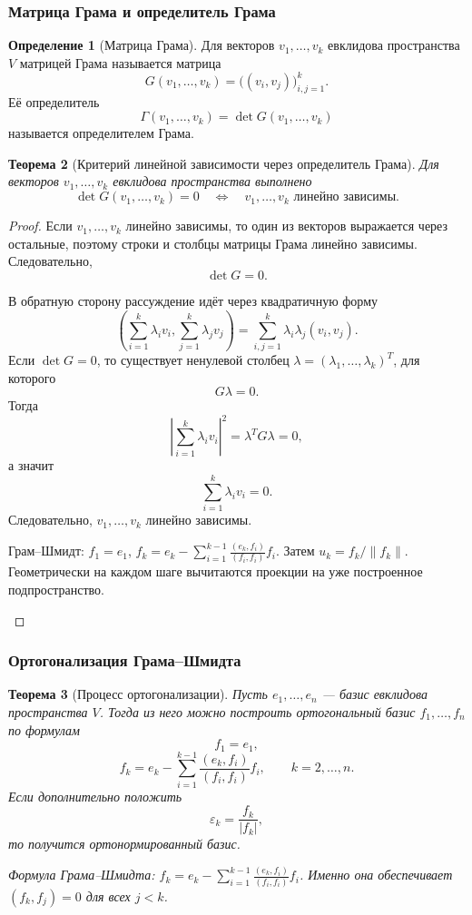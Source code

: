 \documentclass[12pt,a4paper]{article}
\theoremstyle{definition}
\newtheorem{definition}{Определение}[section]
\theoremstyle{plain}
\newtheorem{theorem}[definition]{Теорема}
\theoremstyle{remark}
\newenvironment{knowledgefix}{\begin{clarifybox}}{\end{clarifybox}}
\begin{document}
\subsubsection{Матрица Грама и определитель Грама}


\begin{definition}[Матрица Грама]
Для векторов $v_1,\ldots,v_k$ евклидова пространства $V$ матрицей Грама называется матрица
\[
    G(v_1,\ldots,v_k)=\bigl((v_i,v_j)\bigr)_{i,j=1}^k.
\]
Её определитель
\[
    \Gamma(v_1,\ldots,v_k)=\det G(v_1,\ldots,v_k)
\]
называется определителем Грама.
\end{definition}

\begin{theorem}[Критерий линейной зависимости через определитель Грама]
Для векторов $v_1,\ldots,v_k$ евклидова пространства выполнено
\[
    \det G(v_1,\ldots,v_k)=0
    \quad\Longleftrightarrow\quad
    v_1,\ldots,v_k \text{ линейно зависимы}.
\]
\end{theorem}

\begin{proof}
Если $v_1,\ldots,v_k$ линейно зависимы, то один из векторов выражается через остальные, поэтому строки и столбцы матрицы Грама линейно зависимы. Следовательно,
\[
    \det G=0.
\]

В обратную сторону рассуждение идёт через квадратичную форму
\[
    \left(\sum_{i=1}^k \lambda_i v_i,
          \sum_{j=1}^k \lambda_j v_j\right)
    =\sum_{i,j=1}^k \lambda_i\lambda_j (v_i,v_j).
\]
Если $\det G=0$, то существует ненулевой столбец $\lambda=(\lambda_1,\ldots,\lambda_k)^T$, для которого
\[
    G\lambda=0.
\]
Тогда
\[
    \left|\sum_{i=1}^k\lambda_i v_i\right|^2
    =\lambda^T G\lambda=0,
\]
а значит
\[
    \sum_{i=1}^k\lambda_i v_i=0.
\]
Следовательно, $v_1,\ldots,v_k$ линейно зависимы.
\begin{knowledgefix}
Грам--Шмидт: \(f_1=e_1\), \(f_k=e_k-\sum_{i=1}^{k-1}\frac{(e_k,f_i)}{(f_i,f_i)}f_i\). Затем \(u_k=f_k/\|f_k\|\). Геометрически на каждом шаге вычитаются проекции на уже построенное подпространство.
\end{knowledgefix}
\end{proof}

\subsubsection{Ортогонализация Грама--Шмидта}


\begin{theorem}[Процесс ортогонализации]
Пусть $e_1,\ldots,e_n$ --- базис евклидова пространства $V$. Тогда из него можно построить ортогональный базис $f_1,\ldots,f_n$ по формулам
\[
    f_1=e_1,
\]
\[
    f_k=e_k-\sum_{i=1}^{k-1}\frac{(e_k,f_i)}{(f_i,f_i)}f_i,
    \qquad k=2,\ldots,n.
\]
Если дополнительно положить
\[
    \varepsilon_k=\frac{f_k}{|f_k|},
\]
то получится ортонормированный базис.
\begin{knowledgefix}
Формула Грама--Шмидта: \(f_k=e_k-\sum\limits_{i=1}^{k-1}\frac{(e_k,f_i)}{(f_i,f_i)}f_i\). Именно она обеспечивает \((f_k,f_j)=0\) для всех \(j<k\).
\end{knowledgefix}
\end{theorem}
\end{document}
